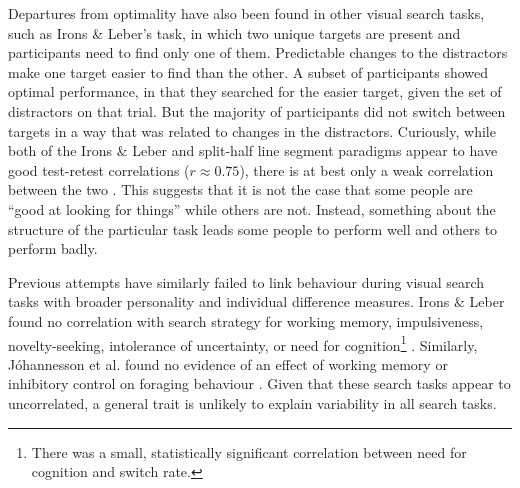 \documentclass[]{rsos}
\begin{document}
Departures from optimality have also been found in other visual search tasks, such as Irons \& Leber's \cite{irons-leber2016,irons-leber2018} task, in which two unique targets are present and participants need to find only one of them. Predictable changes to the distractors make one target easier to find than the other. A subset of participants showed optimal performance, in that they searched for the easier target, given the set of distractors on that trial. But the majority of participants did not switch between targets in a way that was related to changes in the distractors. Curiously, while both of the Irons \& Leber and split-half line segment paradigms appear to have good test-retest correlations ($r \approx 0.75$), there is at best only a weak correlation between the two \cite{clarke2019}. This suggests that it is not the case that some people are ``good at looking for things'' while others are not. Instead, something about the structure of the particular task leads some people to perform well and others to perform badly.

Previous attempts have similarly failed to link behaviour during visual search tasks with broader personality and individual difference measures. Irons \& Leber found no correlation with search strategy for working memory, impulsiveness, novelty-seeking, intolerance of uncertainty, or need for cognition\footnote{There was a small, statistically significant correlation between need for cognition and switch rate.} \cite{irons-leber2016,irons-leber2018}. Similarly, J{\'o}hannesson et al. found no evidence of an effect of working memory or inhibitory control on foraging behaviour \cite{johannesson2017}. Given that these search tasks appear to uncorrelated, a general trait is unlikely to explain variability in all search tasks.  
\end{document}
